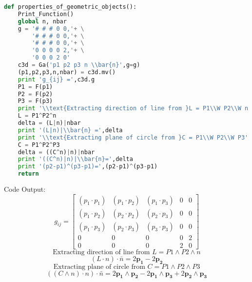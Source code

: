 \documentclass[10pt,fleqn]{report}
\newcommand{\W}{\wedge}
\begin{document}
\begin{lstlisting}[language=Python,showspaces=false,showstringspaces=false,backgroundcolor=\color{gray},frame=single]
def properties_of_geometric_objects():
    Print_Function()
    global n, nbar
    g = '# # # 0 0,'+ \
        '# # # 0 0,'+ \
        '# # # 0 0,'+ \
        '0 0 0 0 2,'+ \
        '0 0 0 2 0'
    c3d = Ga('p1 p2 p3 n \\bar{n}',g=g)
    (p1,p2,p3,n,nbar) = c3d.mv()
    print 'g_{ij} =',c3d.g
    P1 = F(p1)
    P2 = F(p2)
    P3 = F(p3)
    print '\\text{Extracting direction of line from }L = P1\\W P2\\W n'
    L = P1^P2^n
    delta = (L|n)|nbar
    print '(L|n)|\\bar{n} =',delta
    print '\\text{Extracting plane of circle from }C = P1\\W P2\\W P3'
    C = P1^P2^P3
    delta = ((C^n)|n)|nbar
    print '((C^n)|n)|\\bar{n}=',delta
    print '(p2-p1)^(p3-p1)=',(p2-p1)^(p3-p1)
    return
\end{lstlisting}
Code Output:
\begin{equation*} g_{ij} = \left[\begin{matrix}\left ( p_{1}\cdot p_{1}\right )  & \left ( p_{1}\cdot p_{2}\right )  & \left ( p_{1}\cdot p_{3}\right )  & 0 & 0\\\left ( p_{1}\cdot p_{2}\right )  & \left ( p_{2}\cdot p_{2}\right )  & \left ( p_{2}\cdot p_{3}\right )  & 0 & 0\\\left ( p_{1}\cdot p_{3}\right )  & \left ( p_{2}\cdot p_{3}\right )  & \left ( p_{3}\cdot p_{3}\right )  & 0 & 0\\0 & 0 & 0 & 0 & 2\\0 & 0 & 0 & 2 & 0\end{matrix}\right] \end{equation*}
\begin{equation*} \text{Extracting direction of line from }L = P1\W P2\W n \end{equation*}
\begin{equation*} (L\cdot n)\cdot \bar{n} = 2 \boldsymbol{p_{1}} -2 \boldsymbol{p_{2}} \end{equation*}
\begin{equation*} \text{Extracting plane of circle from }C = P1\W P2\W P3 \end{equation*}
\begin{equation*} ((C\W n)\cdot n)\cdot \bar{n}= 2 \boldsymbol{p_{1}\wedge p_{2}} -2 \boldsymbol{p_{1}\wedge p_{3}} + 2 \boldsymbol{p_{2}\wedge p_{3}} \end{equation*}
\end{document}
